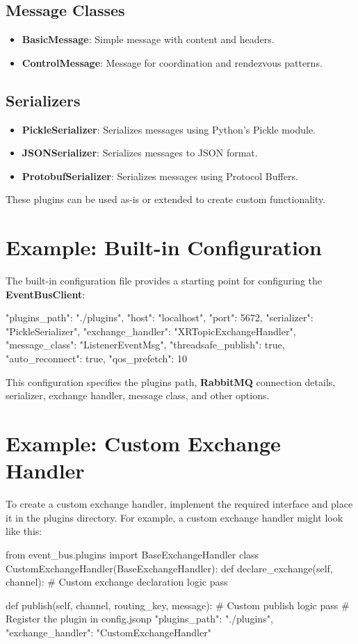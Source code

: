 \subsection*{Message Classes}
\begin{itemize}
  \item \textbf{BasicMessage}: Simple message with content and headers.
  \item \textbf{ControlMessage}: Message for coordination and rendezvous patterns.
\end{itemize}

\subsection*{Serializers}
\begin{itemize}
  \item \textbf{PickleSerializer}: Serializes messages using Python's Pickle module.
  \item \textbf{JSONSerializer}: Serializes messages to JSON format.
  \item \textbf{ProtobufSerializer}: Serializes messages using Protocol Buffers.
\end{itemize}
These plugins can be used as-is or extended to create custom functionality.

\newpage
\section{Example: Built-in Configuration}
The built-in configuration file  provides a starting point for configuring the \textbf{EventBusClient}:
\begin{pythoncode}
{
  "plugins_path": "./plugins",
  "host": "localhost",
  "port": 5672,
  "serializer": "PickleSerializer",
  "exchange_handler": "XRTopicExchangeHandler",
  "message_class": "ListenerEventMsg",
  "threadsafe_publish": true,
  "auto_reconnect": true,
  "qos_prefetch": 10
}
\end{pythoncode}

This configuration specifies the plugins path, \textbf{RabbitMQ} connection details, serializer, exchange handler, message class, and other options.


\section{Example: Custom Exchange Handler}\label{sec:example:-custom-exchange-handler}
To create a custom exchange handler, implement the required interface and place it in the plugins directory. For example, a custom exchange handler might look like this:
\begin{pythoncode}
from event_bus.plugins import BaseExchangeHandler
class CustomExchangeHandler(BaseExchangeHandler):
    def declare_exchange(self, channel):
        # Custom exchange declaration logic
        pass

    def publish(self, channel, routing_key, message):
        # Custom publish logic
        pass
# Register the plugin in config.jsonp
{
  "plugins_path": "./plugins",
  "exchange_handler": "CustomExchangeHandler"
}
\end{pythoncode}

